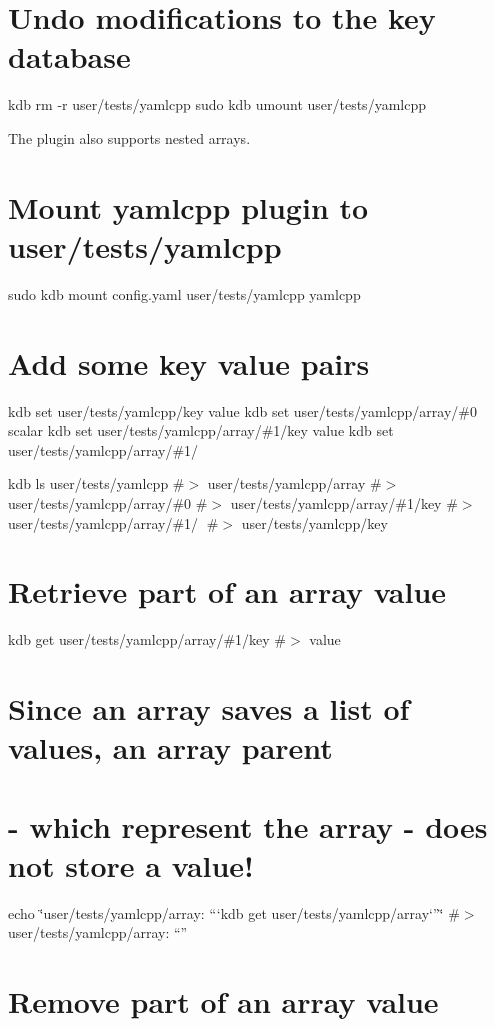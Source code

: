 \section*{Undo modifications to the key database}

kdb rm -\/r user/tests/yamlcpp sudo kdb umount user/tests/yamlcpp 
\begin{DoxyCode}
The plugin also supports nested arrays.
\end{DoxyCode}
 \section*{Mount yamlcpp plugin to {\ttfamily user/tests/yamlcpp}}

sudo kdb mount config.\+yaml user/tests/yamlcpp yamlcpp

\section*{Add some key value pairs}

kdb set user/tests/yamlcpp/key value kdb set user/tests/yamlcpp/array/\#0 scalar kdb set user/tests/yamlcpp/array/\#1/key value kdb set user/tests/yamlcpp/array/\#1/🔑 🙈

kdb ls user/tests/yamlcpp \#$>$ user/tests/yamlcpp/array \#$>$ user/tests/yamlcpp/array/\#0 \#$>$ user/tests/yamlcpp/array/\#1/key \#$>$ user/tests/yamlcpp/array/\#1/🔑 \#$>$ user/tests/yamlcpp/key

\section*{Retrieve part of an array value}

kdb get user/tests/yamlcpp/array/\#1/key \#$>$ value

\section*{Since an array saves a list of values, an array parent}

\section*{-\/ which represent the array -\/ does not store a value!}

echo \char`\"{}user/tests/yamlcpp/array\+: “`kdb get user/tests/yamlcpp/array`”\char`\"{} \#$>$ user/tests/yamlcpp/array\+: “”

\section*{Remove part of an array value}


